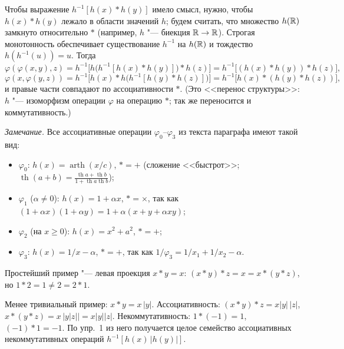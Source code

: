 
\begin{solution}[1 (\S\,4)]
Чтобы выражение $h^{-1}[h(x)*h(y)]$ имело смысл, нужно, чтобы
$h(x)*h(y)$ лежало в области значений $h$; будем считать, что множество
$h(\mathbb R)$ замкнуто относительно $*$ (например, $h$ "--- биекция $\mathbb R\to\mathbb R$).
Строгая монотонность обеспечивает существование $h^{-1}$ на $h(\mathbb R)$
и тождество $h(h^{-1}(u))=u$. Тогда
\[
\varphi(\varphi(x,y),z)=h^{-1}\bigl[h\bigl(h^{-1}[h(x)*h(y)]\bigr)*h(z)\bigr]
=h^{-1}\bigl[(h(x)*h(y))*h(z)\bigr],
\]
\[
\varphi(x,\varphi(y,z))=h^{-1}\bigl[h(x)*h\bigl(h^{-1}[h(y)*h(z)]\bigr)\bigr]
=h^{-1}\bigl[h(x)*(h(y)*h(z))\bigr],
\]
и правые части совпадают по ассоциативности $*$. (Это <<перенос
структуры>>: $h$ "--- изоморфизм операции $\varphi$ на операцию $*$; так же
переносится и коммутативность.)

\emph{Замечание.} Все ассоциативные операции $\varphi_0$--$\varphi_3$ из
текста параграфа имеют такой вид:
\begin{itemize}[nosep]
\item $\varphi_0$: $h(x)=\operatorname{arth}(x/c)$, $*=+$ (сложение
  <<быстрот>>; $\operatorname{th}(a+b)=\frac{\operatorname{th}a+\operatorname{th}b}{1+\operatorname{th}a\operatorname{th}b}$);
\item $\varphi_1$ ($\alpha\ne0$): $h(x)=1+\alpha x$, $*=\times$, так как
  $(1+\alpha x)(1+\alpha y)=1+\alpha(x+y+\alpha xy)$;
\item $\varphi_2$ (на $x\ge0$): $h(x)=x^2+a^2$, $*=+$;
\item $\varphi_3$: $h(x)=1/x-\alpha$, $*=+$, так как
  $1/\varphi_3=1/x_1+1/x_2-\alpha$.
\end{itemize}
\end{solution}

\begin{solution}[2 (\S\,4)]
Простейший пример "--- левая проекция $x*y=x$:
$(x*y)*z=x=x*(y*z)$, но $1*2=1\ne2=2*1$.

Менее тривиальный пример: $x*y=x\,|y|$. Ассоциативность:
$(x*y)*z=x|y|\,|z|$, $x*(y*z)=x\,\bigl|y|z|\bigr|=x|y||z|$. Некоммутативность:
$1*(-1)=1$, $(-1)*1=-1$. По упр.~1 из него получается целое семейство
ассоциативных некоммутативных операций $h^{-1}[h(x)\,|h(y)|]$.
\end{solution}

